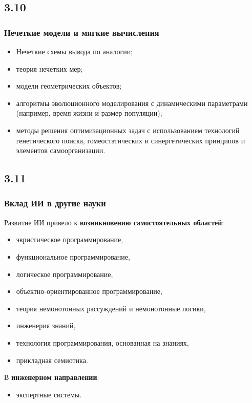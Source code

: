 \documentclass[default]{beamer}
\begin{document}
	\subsection{3.10}
	\begin{frame}
		\frametitle{Нечеткие модели и мягкие вычисления}
		
		\Large 
		\begin{itemize}
			\item Нечеткие схемы вывода по аналогии;
			\item теория нечетких мер; 
			\item модели геометрических объектов;
			\item алгоритмы эволюционного моделирования с динамическими параметрами (например, время жизни и размер популяции);
			\item методы решения оптимизационных задач с использованием технологий генетического поиска, гомеостатических и синергетических принципов и элементов самоорганизации. 
		\end{itemize}
		
	\end{frame}

	\subsection{3.11}
	\begin{frame}
		\frametitle{Вклад ИИ в другие  науки}
		
		Развитие ИИ привело к \textbf{возникновению самостоятельных областей}:
		\begin{itemize}
			\item эвристическое программирование,
			\item функциональное программирование,
			\item логическое программирование,
			\item объектно-ориентированное программирование,
			\item теория немонотонных рассуждений и немонотонные логики,
			\item инженерия знаний,
			\item технология программирования, основанная на знаниях,
			\item прикладная семиотика.
		\end{itemize}
		
		В \textbf{инженерном направлении}:
		\begin{itemize}
			\item экспертные системы.
		\end{itemize}
	\end{frame}
\end{document}
